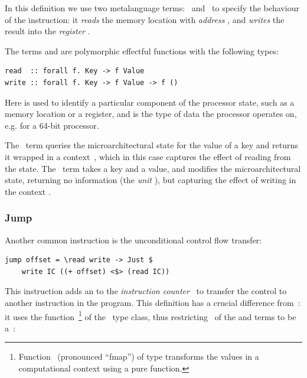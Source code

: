 \noindent
In this definition we use two metalanguage terms:~ and~ to
specify the behaviour of the instruction: it \emph{reads} the memory location
with \emph{address} , and \emph{writes} the result into the
\emph{register} .

The terms  and  are polymorphic effectful functions with the
following types:

\begin{verbatim}
read  :: forall f. Key -> f Value
write :: forall f. Key -> f Value -> f ()
\end{verbatim}

\noindent
Here  is used to identify a particular component of the processor state,
such as a memory location or a register, and  is the type of data the
processor operates on, e.g.  for a 64-bit processor.

The~ term queries the microarchitectural state for the value of a key
and returns it wrapped in a context~, which in this case captures the
effect of reading from the state. The~ term takes a key and a value,
and modifies the microarchitectural state, returning no information (the
\emph{unit} \hs{()}), but capturing the effect of writing in the context .


\subsubsection{Jump}

Another common instruction is the unconditional control flow transfer:

\begin{verbatim}
jump offset = \read write -> Just $
    write IC ((+ offset) <$> (read IC))
\end{verbatim}

\noindent
This instruction adds an  to the \emph{instruction counter}~
to transfer the control to another instruction in the program. This definition
has a crucial difference from~: it uses the
function~\hs{<$>}\footnote{Function~\hs{<$>} (pronounced ``fmap'') of type
 transforms the values in a
computational context  using a pure function.} of the~ type
class, thus restricting~ of the  and  terms to be
a~:

